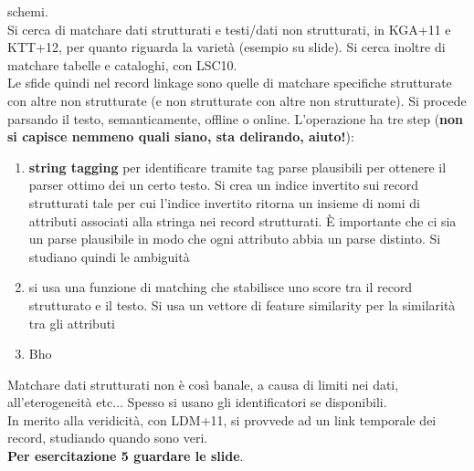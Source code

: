 \documentclass[a4paper,12pt, oneside]{book}
\begin{document}
schemi.\\
Si cerca di matchare dati strutturati e testi/dati non strutturati, in
KGA+11 e KTT+12, per quanto riguarda la varietà (esempio su slide). Si cerca
inoltre di matchare tabelle e cataloghi, con LSC10. \\
Le sfide quindi nel record linkage sono
quelle di matchare specifiche strutturate con altre non strutturate (e non
strutturate con altre non strutturate). Si procede parsando il testo,
semanticamente, offline o online. L'operazione ha tre step (\textbf{non si
  capisce nemmeno quali siano, sta delirando, aiuto!}):
\begin{enumerate}
  \item \textbf{string tagging} per identificare tramite tag parse plausibili
  per ottenere il parser ottimo dei un certo testo. Si crea un indice invertito
  sui record strutturati tale per cui l'indice invertito ritorna un insieme di
  nomi di attributi associati alla stringa nei record strutturati. È importante
  che ci sia un parse plausibile in modo che ogni attributo abbia un parse
  distinto. Si studiano quindi le ambiguità
  \item si usa una funzione di matching che stabilisce uno score tra il record
  strutturato e il testo. Si usa un vettore di feature similarity per la
  similarità tra gli attributi
  \item Bho
\end{enumerate}
Matchare dati strutturati non è così banale, a causa di limiti nei dati,
all'eterogeneità etc$\ldots$ Spesso si usano gli identificatori se
disponibili.\\
In merito alla veridicità, con LDM+11, si provvede ad un link temporale dei
record, studiando quando sono veri. \\
\textbf{Per esercitazione 5 guardare le slide}. 
\end{document}
